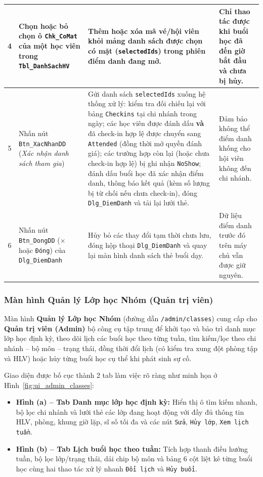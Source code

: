 \documentclass[a4paper,12pt]{article}
\begin{document}
{\begin{longtable}{|c|L{3.5cm}|L{7.8cm}|L{3.5cm}|}
4 & Chọn hoặc bỏ chọn ô \texttt{Chk\_CoMat} của một học viên trong \texttt{Tbl\_DanhSachHV} &
Thêm hoặc xóa mã vé/hội viên khỏi mảng danh sách được chọn có mặt (\texttt{selectedIds}) trong phiên điểm danh đang mở. &
Chỉ thao tác được khi buổi học đã đến giờ bắt đầu và chưa bị hủy. \\ \hline

5 & Nhấn nút \texttt{Btn\_XacNhanDD} (\textit{Xác nhận danh sách tham gia}) &
Gửi danh sách \texttt{selectedIds} xuống hệ thống xử lý: kiểm tra đối chiếu lại với bảng \texttt{Checkins} tại chi nhánh trong ngày; các học viên được đánh dấu \textbf{và} đã check-in hợp lệ được chuyển sang \texttt{Attended} (đồng thời mở quyền đánh giá); các trường hợp còn lại (hoặc chưa check-in hợp lệ) bị ghi nhận \texttt{NoShow}; đánh dấu buổi học đã xác nhận điểm danh, thông báo kết quả (kèm số lượng bị từ chối nếu chưa check-in), đóng \texttt{Dlg\_DiemDanh} và tải lại lưới thẻ. &
Đảm bảo không thể điểm danh khống cho hội viên không đến chi nhánh. \\ \hline

6 & Nhấn nút \texttt{Btn\_DongDD} (\texttt{$\times$} hoặc \texttt{Đóng}) của \texttt{Dlg\_DiemDanh} &
Hủy bỏ các thay đổi tạm thời chưa lưu, đóng hộp thoại \texttt{Dlg\_DiemDanh} và quay lại màn hình danh sách thẻ buổi dạy. &
Dữ liệu điểm danh trước đó trên máy chủ vẫn được giữ nguyên. \\ \hline

\end{longtable}
}


\subsubsection{Màn hình Quản lý Lớp học Nhóm (Quản trị viên)}
Màn hình \textbf{Quản lý Lớp học Nhóm} (đường dẫn \texttt{/admin/classes}) cung cấp cho \textbf{Quản trị viên (Admin)} bộ công cụ tập trung để khởi tạo và bảo trì danh mục lớp học định kỳ, theo dõi lịch các buổi học theo từng tuần, tìm kiếm/lọc theo chi nhánh -- bộ môn -- trạng thái, đồng thời đổi lịch (có kiểm tra xung đột phòng tập và HLV) hoặc hủy từng buổi học cụ thể khi phát sinh sự cố.

Giao diện được bố cục thành 2 tab làm việc rõ ràng như minh họa ở Hình~\ref{fig:ui_admin_classes}:
\begin{itemize}
    \item \textbf{Hình (a) -- Tab Danh mục lớp học định kỳ:} Hiển thị ô tìm kiếm nhanh, bộ lọc chi nhánh và lưới thẻ các lớp đang hoạt động với đầy đủ thông tin HLV, phòng, khung giờ lặp, sĩ số tối đa và các nút \texttt{Sửa}, \texttt{Hủy lớp}, \texttt{Xem lịch tuần}.
    \item \textbf{Hình (b) -- Tab Lịch buổi học theo tuần:} Tích hợp thanh điều hướng tuần, bộ lọc lớp/trạng thái, dải chip bộ môn và bảng $6$ cột liệt kê từng buổi học cùng hai thao tác xử lý nhanh \texttt{Đổi lịch} và \texttt{Hủy buổi}.
\end{itemize}
\end{document}
